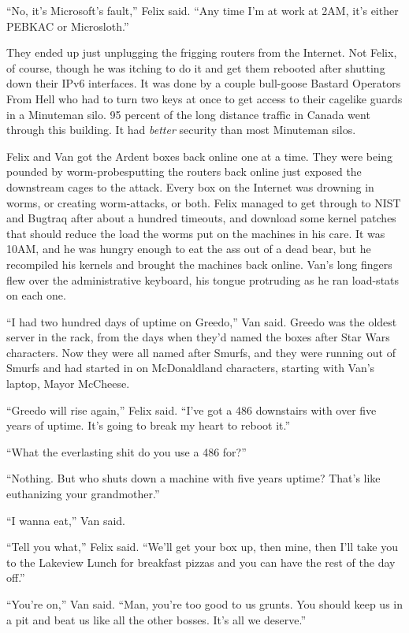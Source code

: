 “No, it’s Microsoft’s fault,” Felix said. “Any time I’m at work at
2AM, it’s either PEBKAC or Microsloth.”

\tb

They ended up just unplugging the frigging routers from the
Internet. Not Felix, of course, though he was itching to do it and
get them rebooted after shutting down their IPv6 interfaces. It was
done by a couple bull-goose Bastard Operators From Hell who had to
turn two keys at once to get access to their cage\dash{}like guards in a
Minuteman silo. 95 percent of the long distance traffic in Canada
went through this building. It had \emph{better} security than most
Minuteman silos.

Felix and Van got the Ardent boxes back online one at a time. They
were being pounded by worm-probes\dash{}putting the routers back online
just exposed the downstream cages to the attack. Every box on the
Internet was drowning in worms, or creating worm-attacks, or both.
Felix managed to get through to NIST and Bugtraq after about a
hundred timeouts, and download some kernel patches that should
reduce the load the worms put on the machines in his care. It was
10AM, and he was hungry enough to eat the ass out of a dead bear,
but he recompiled his kernels and brought the machines back online.
Van’s long fingers flew over the administrative keyboard, his
tongue protruding as he ran load-stats on each one.

“I had two hundred days of uptime on Greedo,” Van said. Greedo was
the oldest server in the rack, from the days when they’d named the
boxes after Star Wars characters. Now they were all named after
Smurfs, and they were running out of Smurfs and had started in on
McDonaldland characters, starting with Van’s laptop, Mayor
McCheese.

“Greedo will rise again,” Felix said. “I’ve got a 486 downstairs
with over five years of uptime. It’s going to break my heart to
reboot it.”

“What the everlasting shit do you use a 486 for?”

“Nothing. But who shuts down a machine with five years uptime?
That’s like euthanizing your grandmother.”

“I wanna eat,” Van said.

“Tell you what,” Felix said. “We’ll get your box up, then mine,
then I’ll take you to the Lakeview Lunch for breakfast pizzas and
you can have the rest of the day off.”

“You’re on,” Van said. “Man, you’re too good to us grunts. You
should keep us in a pit and beat us like all the other bosses. It’s
all we deserve.”


